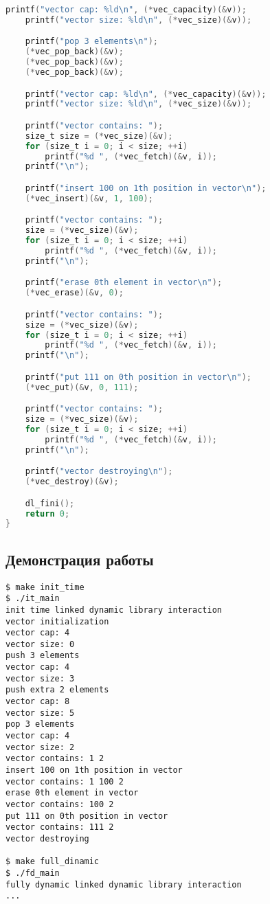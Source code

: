 \documentclass[12pt]{article}
\begin{document}
\begin{lstlisting}[language=C, basicstyle=\scriptsize]
    printf("vector cap: %ld\n", (*vec_capacity)(&v));
    printf("vector size: %ld\n", (*vec_size)(&v));

    printf("pop 3 elements\n");
    (*vec_pop_back)(&v);
    (*vec_pop_back)(&v);
    (*vec_pop_back)(&v);

    printf("vector cap: %ld\n", (*vec_capacity)(&v));
    printf("vector size: %ld\n", (*vec_size)(&v));

    printf("vector contains: ");
    size_t size = (*vec_size)(&v);
    for (size_t i = 0; i < size; ++i)
        printf("%d ", (*vec_fetch)(&v, i));
    printf("\n");

    printf("insert 100 on 1th position in vector\n");
    (*vec_insert)(&v, 1, 100);

    printf("vector contains: ");
    size = (*vec_size)(&v);
    for (size_t i = 0; i < size; ++i)
        printf("%d ", (*vec_fetch)(&v, i));
    printf("\n");

    printf("erase 0th element in vector\n");
    (*vec_erase)(&v, 0);

    printf("vector contains: ");
    size = (*vec_size)(&v);
    for (size_t i = 0; i < size; ++i)
        printf("%d ", (*vec_fetch)(&v, i));
    printf("\n");

    printf("put 111 on 0th position in vector\n");
    (*vec_put)(&v, 0, 111);

    printf("vector contains: ");
    size = (*vec_size)(&v);
    for (size_t i = 0; i < size; ++i)
        printf("%d ", (*vec_fetch)(&v, i));
    printf("\n");

    printf("vector destroying\n");
    (*vec_destroy)(&v);

    dl_fini();
    return 0;
}
\end{lstlisting}

\subsection*{Демонстрация работы}

\begin{lstlisting}
$ make init_time
$ ./it_main
init time linked dynamic library interaction
vector initialization
vector cap: 4
vector size: 0
push 3 elements
vector cap: 4
vector size: 3
push extra 2 elements
vector cap: 8
vector size: 5
pop 3 elements
vector cap: 4
vector size: 2
vector contains: 1 2 
insert 100 on 1th position in vector
vector contains: 1 100 2 
erase 0th element in vector
vector contains: 100 2 
put 111 on 0th position in vector
vector contains: 111 2 
vector destroying

$ make full_dinamic
$ ./fd_main
fully dynamic linked dynamic library interaction
...
\end{lstlisting}
\end{document}
